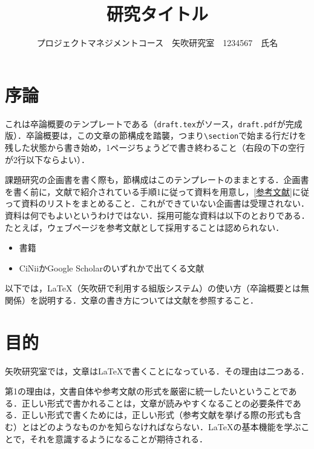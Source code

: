 \documentclass[uplatex,twocolumn,dvipdfmx]{jsarticle}
\title{\vspace{-5mm}\fontsize{14pt}{0pt}\selectfont 研究タイトル}
\author{\normalsize プロジェクトマネジメントコース　矢吹研究室　1234567　氏名}
\date{}
\begin{document}
\fontsize{10.5pt}{\baselineskip}\selectfont
\maketitle





\section{序論}\label{序論}

これは卒論概要のテンプレートである（\verb|draft.tex|がソース，\verb|draft.pdf|が完成版）．卒論概要は，この文章の節構成を踏襲，つまり\verb|\section|で始まる行だけを残した状態から書き始め，1ページちょうどで書き終わること（右段の下の空行が2行以下ならよい）．

課題研究の企画書を書く際も，節構成はこのテンプレートのままとする．企画書を書く前に，文献\cite{アイデアのつくり方}で紹介されている手順1に従って資料を用意し，\ref{参考文献}に従って資料のリストをまとめること．これができていない企画書は受理されない．資料は何でもよいというわけではない．採用可能な資料は以下のとおりである．たとえば，ウェブページを参考文献として採用することは認められない．

\begin{itemize}
\item 書籍
\item CiNiiかGoogle Scholarのいずれかで出てくる文献
\end{itemize}

以下では，\LaTeX （矢吹研で利用する組版システム）の使い方（卒論概要とは無関係）を説明する．文章の書き方については文献\cite{書く技術}を参照すること．

\section{目的}

矢吹研究室では，文章は\LaTeX で書くことになっている．その理由は二つある．

第1の理由は，文書自体や参考文献の形式を厳密に統一したいということである．正しい形式で書かれることは，文章が読みやすくなることの必要条件である．正しい形式で書くためには，正しい形式（参考文献を挙げる際の形式も含む）とはどのようなものかを知らなければならない．\LaTeX の基本機能を学ぶことで，それを意識するようになることが期待される．
\end{document}
